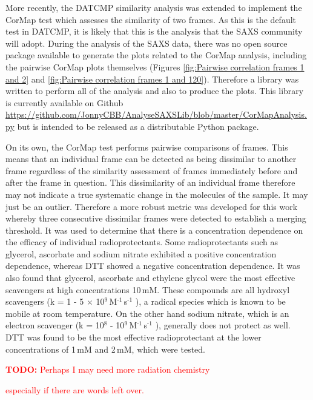 More recently, the DATCMP similarity analysis was extended to implement the CorMap test which assesses the similarity of two frames.
As this is the default test in DATCMP, it is likely that this is the analysis that the SAXS community will adopt.
During the analysis of the SAXS data, there was no open source package available to generate the plots related to the CorMap analysis, including the pairwise CorMap plots themselves (Figures \ref{fig:Pairwise correlation frames 1 and 2} and \ref{fig:Pairwise correlation frames 1 and 120}).
Therefore a library was written to perform all of the analysis and also to produce the plots.
This library is currently available on Github \url{https://github.com/JonnyCBB/AnalyseSAXSLib/blob/master/CorMapAnalysis.py} but is intended to be released as a distributable Python package.

On its own, the CorMap test performs pairwise comparisons of frames.
This means that an individual frame can be detected as being dissimilar to another frame regardless of the similarity assessment of frames immediately before and after the frame in question.
This dissimilarity of an individual frame therefore may not indicate a true systematic change in the molecules of the sample.
It may just be an outlier.
Therefore a more robust metric was developed for this work whereby three consecutive dissimilar frames were detected to establish a merging threshold.
It was used to determine that there is a concentration dependence on the efficacy of individual radioprotectants. Some radioprotectants such as glycerol, ascorbate and sodium nitrate exhibited a positive concentration dependence, whereas DTT showed a negative concentration dependence.
It was also found that glycerol, ascorbate and ethylene glycol were the most effective scavengers at high concentrations 10$\,$mM.
These compounds are all hydroxyl scavengers (k = 1 - 5 $\times$ 10$^{\text{9}}\,$M$^{\text{-1}}\,$s$^{\text{-1}}$ \cite{garrison1987reaction}), a radical species which is known to be mobile at room temperature.
On the other hand sodium nitrate, which is an electron scavenger (k = 10$^{\text{8}}$ -  10$^{\text{9}}\,$M$^{\text{-1}}\,$s$^{\text{-1}}$ \cite{garrison1987reaction,allan2012}), generally does not protect as well.
DTT was found to be the most effective radioprotectant at the lower concentrations of 1$\,$mM and 2$\,$mM, which were tested.
\textcolor{red}{
    \begin{myenumerate}
        \item \hypertarget{todo:more chemical information}{\textbf{TODO:} Perhaps I may need more radiation chemistry}
        especially if there are words left over.
    \end{myenumerate}
}

